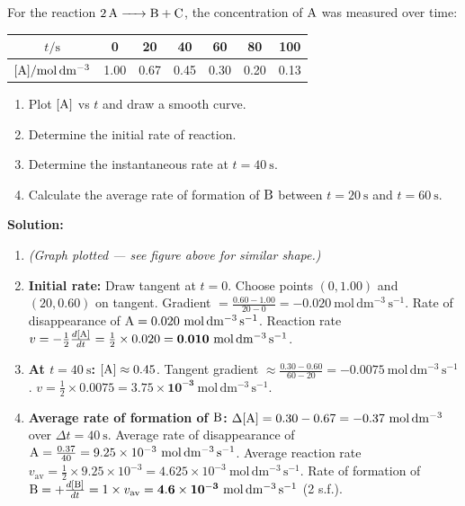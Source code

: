 \documentclass[11pt]{article}
\begin{document}
\begin{exoresolu}
For the reaction $\ce{2A -> B + C}$, the concentration of $\ce{A}$ was measured over time:
\begin{center}
\begin{tabular}{|c|cccccc|}\hline
$t / \mathrm{s}$ & 0 & 20 & 40 & 60 & 80 & 100 \\ \hline
$[\ce{A}] / \mathrm{mol\,dm^{-3}}$ & 1.00 & 0.67 & 0.45 & 0.30 & 0.20 & 0.13 \\ \hline
\end{tabular}
\end{center}
\begin{enumerate}
\item Plot $[\ce{A}]$ vs $t$ and draw a smooth curve.
\item Determine the initial rate of reaction.
\item Determine the instantaneous rate at $t = 40\ \mathrm{s}$.
\item Calculate the average rate of formation of $\ce{B}$ between $t = 20\ \mathrm{s}$ and $t = 60\ \mathrm{s}$.
\end{enumerate}
\tcblower
\textbf{Solution:}
\begin{enumerate}
\item \textit{(Graph plotted — see figure above for similar shape.)}
\item \textbf{Initial rate:} Draw tangent at $t=0$. Choose points $(0, 1.00)$ and $(20, 0.60)$ on tangent.
Gradient $= \frac{0.60 - 1.00}{20 - 0} = -0.020\ \mathrm{mol\,dm^{-3}\,s^{-1}}$.
Rate of disappearance of $\ce{A} = 0.020\ \mathrm{mol\,dm^{-3}\,s^{-1}}$.
Reaction rate $v = -\frac{1}{2}\frac{d[\ce{A}]}{dt} = \frac{1}{2} \times 0.020 = \mathbf{0.010\ \mathrm{mol\,dm^{-3}\,s^{-1}}}$.
\item \textbf{At $t = 40\ \mathrm{s}$:} $[\ce{A}] \approx 0.45$. Tangent gradient $\approx \frac{0.30 - 0.60}{60 - 20} = -0.0075\ \mathrm{mol\,dm^{-3}\,s^{-1}}$.
$v = \frac{1}{2} \times 0.0075 = \mathbf{3.75 \times 10^{-3}\ \mathrm{mol\,dm^{-3}\,s^{-1}}}$.
\item \textbf{Average rate of formation of $\ce{B}$:}
$\Delta[\ce{A}] = 0.30 - 0.67 = -0.37\ \mathrm{mol\,dm^{-3}}$ over $\Delta t = 40\ \mathrm{s}$.
Average rate of disappearance of $\ce{A} = \frac{0.37}{40} = 9.25 \times 10^{-3}\ \mathrm{mol\,dm^{-3}\,s^{-1}}$.
Average reaction rate $v_{\text{av}} = \frac{1}{2} \times 9.25 \times 10^{-3} = 4.625 \times 10^{-3}\ \mathrm{mol\,dm^{-3}\,s^{-1}}$.
Rate of formation of $\ce{B} = +\frac{d[\ce{B}]}{dt} = 1 \times v_{\text{av}} = \mathbf{4.6 \times 10^{-3}\ \mathrm{mol\,dm^{-3}\,s^{-1}}}$ (2 s.f.).
\end{enumerate}
\end{exoresolu}
\end{document}
